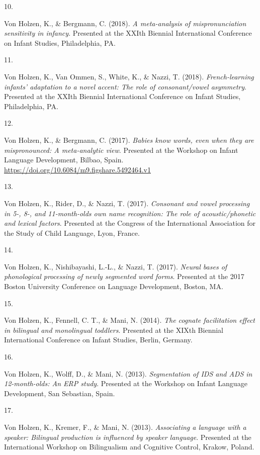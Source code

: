 \documentclass[10pt,a4paper,]{article}
\newlength{\cslhangindent}
\newlength{\csllabelwidth}
\newcommand{\CSLLeftMargin}[1]{\parbox[t]{\csllabelwidth}{\hfill #1~}}
\newcommand{\CSLRightInline}[1]{\parbox[t]{\linewidth - \cslhangindent - \csllabelwidth}{#1}\vspace{0.8ex}}
\begin{document}
\leavevmode{}%
\CSLLeftMargin{10. }%
\CSLRightInline{Von Holzen, K., \& Bergmann, C. (2018). \emph{A
meta-analysis of mispronunciation sensitivity in infancy}. Presented at
the XXIth Biennial International Conference on Infant Studies,
Philadelphia, PA.}

\leavevmode{}%
\CSLLeftMargin{11. }%
\CSLRightInline{Von Holzen, K., Van Ommen, S., White, K., \& Nazzi, T.
(2018). \emph{French-learning infants' adaptation to a novel accent: The
role of consonant/vowel asymmetry}. Presented at the XXIth Biennial
International Conference on Infant Studies, Philadelphia, PA.}

\leavevmode{}%
\CSLLeftMargin{12. }%
\CSLRightInline{Von Holzen, K., \& Bergmann, C. (2017). \emph{Babies
know words, even when they are mispronounced: A meta-analytic view}.
Presented at the Workshop on Infant Language Development, Bilbao, Spain.
\url{https://doi.org/10.6084/m9.figshare.5492464.v1}}

\leavevmode{}%
\CSLLeftMargin{13. }%
\CSLRightInline{Von Holzen, K., Rider, D., \& Nazzi, T. (2017).
\emph{Consonant and vowel processing in 5-, 8-, and 11-month-olds own
name recognition: The role of acoustic/phonetic and lexical factors}.
Presented at the Congress of the International Association for the Study
of Child Language, Lyon, France.}

\leavevmode{}%
\CSLLeftMargin{14. }%
\CSLRightInline{Von Holzen, K., Nishibayashi, L.-L., \& Nazzi, T.
(2017). \emph{Neural bases of phonological processing of newly segmented
word forms}. Presented at the 2017 Boston University Conference on
Language Development, Boston, MA.}

\leavevmode{}%
\CSLLeftMargin{15. }%
\CSLRightInline{Von Holzen, K., Fennell, C. T., \& Mani, N. (2014).
\emph{The cognate facilitation effect in bilingual and monolingual
toddlers}. Presented at the XIXth Biennial International Conference on
Infant Studies, Berlin, Germany.}

\leavevmode{}%
\CSLLeftMargin{16. }%
\CSLRightInline{Von Holzen, K., Wolff, D., \& Mani, N. (2013).
\emph{Segmentation of IDS and ADS in 12-month-olds: An ERP study}.
Presented at the Workshop on Infant Language Development, San Sebastian,
Spain.}

\leavevmode{}%
\CSLLeftMargin{17. }%
\CSLRightInline{Von Holzen, K., Kremer, F., \& Mani, N. (2013).
\emph{Associating a language with a speaker: Bilingual production is
influenced by speaker language}. Presented at the International Workshop
on Bilingualism and Cognitive Control, Krakow, Poland.}
\end{document}
